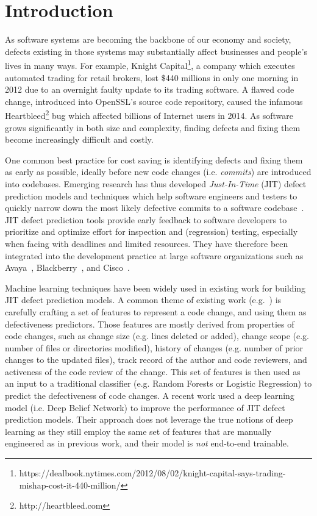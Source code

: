 \section{Introduction}
\label{sec:intro}
As software systems are becoming the backbone of our economy and society, defects existing in those systems may substantially affect businesses and people's lives  in many ways. For example, Knight Capital\footnote{https://dealbook.nytimes.com/2012/08/02/knight-capital-says-trading-mishap-cost-it-440-million/}, a company which executes automated trading  for retail brokers, lost $\$$440 millions in only one morning in 2012 due to an overnight faulty update to its trading software. A flawed code change, introduced into OpenSSL's source code repository, caused the infamous Heartbleed\footnote{http://heartbleed.com} bug which affected billions of Internet users in 2014. As software grows significantly in both size and complexity, finding defects and fixing them become increasingly difficult and costly.

One common best practice for cost saving is identifying defects and fixing them as early as possible, ideally before new code changes (i.e. \emph{commits}) are introduced into codebases. Emerging research has thus developed \emph{Just-In-Time} (JIT) defect prediction models and techniques which help software engineers and testers to quickly narrow down the most likely defective commits to a software codebase~\cite{KameiS16,D'Ambros:2012:EDP}. JIT defect prediction tools provide early feedback to software developers to prioritize and optimize effort for inspection and (regression) testing, especially when facing with deadlines and limited resources. They have therefore been integrated into the development practice at large software organizations such as Avaya~\cite{Mockus2000}, Blackberry~\cite{Shihab:2012:ISR}, and Cisco~\cite{Tantithamthavorn:2015:IMP}.

Machine learning techniques have been widely used in existing work for building JIT defect prediction models. A common theme of existing work (e.g.~\cite{Kamei:2013:LES,Kim:2008:CSC,Kononenko:2015,Mockus2000}) is carefully crafting a set of features to represent a code change, and using them as defectiveness predictors. Those features are mostly derived from properties of code changes, such as change size (e.g. lines deleted or added), change scope (e.g. number of files or directories modified), history of changes (e.g. number of prior changes to the updated files), track record of the author and code reviewers, and activeness of the code review of the change. This set of features is then used as an input to a traditional classifier (e.g. Random Forests or Logistic Regression) to predict the defectiveness of code changes. A recent work \cite{Yang:2015:DLJ}  used a deep learning model (i.e. Deep Belief Network) to improve the performance of JIT defect prediction models. Their approach does not leverage the true notions of deep learning as they still employ the same set of features that are manually engineered as in previous work, and their model is \emph{not} end-to-end trainable.

